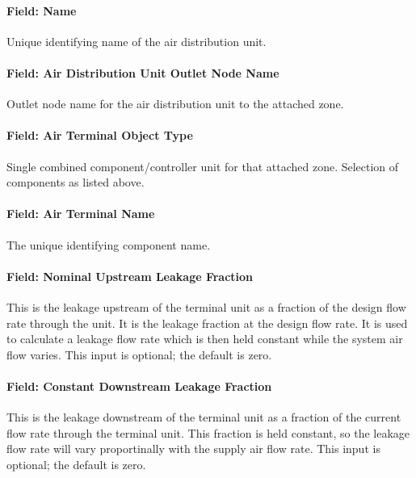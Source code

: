 \paragraph{Field: Name}\label{field-name-053}

Unique identifying name of the air distribution unit.

\paragraph{Field: Air Distribution Unit Outlet Node Name}\label{field-air-distribution-unit-outlet-node-name}

Outlet node name for the air distribution unit to the attached zone.

\paragraph{Field: Air Terminal Object Type}\label{field-air-terminal-object-type}

Single combined component/controller unit for that attached zone. Selection of components as listed above.

\paragraph{Field: Air Terminal Name}\label{field-air-terminal-name}

The unique identifying component name.

\paragraph{Field: Nominal Upstream Leakage Fraction}\label{field-nominal-upstream-leakage-fraction}

This is the leakage upstream of the terminal unit as a fraction of the design flow rate through the unit. It is the leakage fraction at the design flow rate. It is used to calculate a leakage flow rate which is then held constant while the system air flow varies. This input is optional; the default is zero.

\paragraph{Field: Constant Downstream Leakage Fraction}\label{field-constant-downstream-leakage-fraction}

This is the leakage downstream of the terminal unit as a fraction of the current flow rate through the terminal unit. This fraction is held constant, so the leakage flow rate will vary proportinally with the supply air flow rate. This input is optional; the default is zero.

